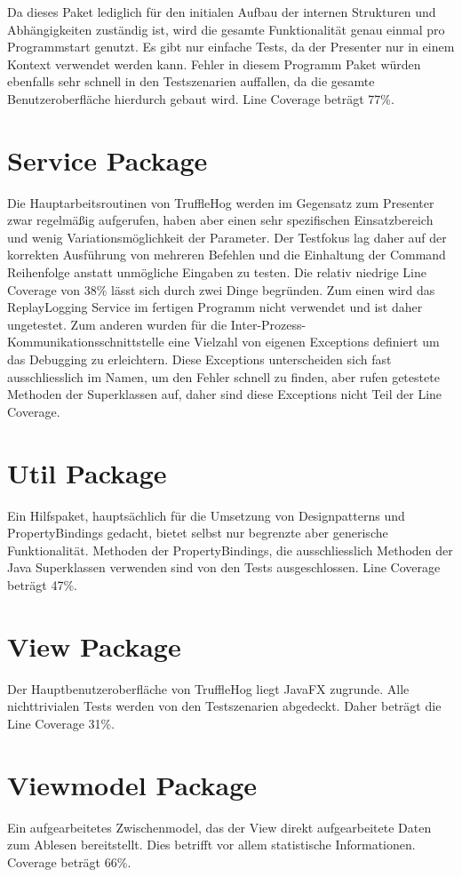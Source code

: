 Da dieses Paket lediglich für den initialen Aufbau der internen Strukturen und Abhängigkeiten zuständig ist, wird die gesamte Funktionalität genau einmal pro Programmstart genutzt. Es gibt nur einfache Tests, da der Presenter nur in einem Kontext verwendet werden kann. Fehler in diesem Programm Paket würden ebenfalls sehr schnell in den Testszenarien auffallen, da die gesamte Benutzeroberfläche hierdurch gebaut wird. Line Coverage beträgt 77\%.

\section{Service Package}

Die Hauptarbeitsroutinen von TruffleHog werden im Gegensatz zum Presenter zwar regelmäßig aufgerufen, haben aber einen sehr spezifischen Einsatzbereich und wenig Variationsmöglichkeit der Parameter. Der Testfokus lag daher auf der korrekten Ausführung von mehreren Befehlen und die Einhaltung der Command Reihenfolge anstatt unmögliche Eingaben zu testen. Die relativ niedrige Line Coverage von 38\% lässt sich durch zwei Dinge begründen. Zum einen wird das ReplayLogging Service im fertigen Programm nicht verwendet und ist daher ungetestet. Zum anderen wurden für die Inter-Prozess-Kommunikationsschnittstelle eine Vielzahl von eigenen Exceptions definiert um das Debugging zu erleichtern. Diese Exceptions unterscheiden sich fast ausschliesslich im Namen, um den Fehler schnell zu finden, aber rufen getestete Methoden der Superklassen auf, daher sind diese Exceptions nicht Teil der Line Coverage.

\section{Util Package}

Ein Hilfspaket, hauptsächlich für die Umsetzung von Designpatterns und PropertyBindings gedacht, bietet selbst nur begrenzte aber generische Funktionalität. Methoden der PropertyBindings, die ausschliesslich Methoden der Java Superklassen verwenden sind von den Tests ausgeschlossen. Line Coverage beträgt 47\%.

\section{View Package}

Der Hauptbenutzeroberfläche von TruffleHog liegt JavaFX zugrunde. Alle nichttrivialen Tests werden von den Testszenarien abgedeckt. Daher beträgt die Line Coverage 31\%.

\section{Viewmodel Package}

Ein aufgearbeitetes Zwischenmodel, das der View direkt aufgearbeitete Daten zum Ablesen bereitstellt. Dies betrifft vor allem statistische Informationen. Coverage beträgt 66\%.
